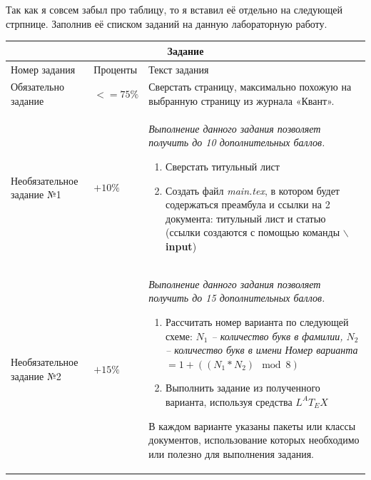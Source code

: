 \newpage
Так как я совсем забыл про таблицу, то я вставил её отдельно на следующей стрпнице. 
Заполнив её списком заданий на данную лабораторную работу.
\begin{center}
	\begin{tabular}{|p{4cm}|p{2cm}|p{10cm}|}
		\hline
		\multicolumn{3}{|c|}{Задание} \\
		\hline
		Номер задания & Проценты & Текст задания \\
		\hline
		Обязательно задание & $<= 75\%$ & Сверстать страницу, максимально
		похожую на выбранную страницу из журнала «Квант». \\
		\hline
		Необязательное задание №1 & $+10\%$ & 
		\textit{Выполнение данного задания позволяет получить до 10
		дополнительных баллов.}
		\begin{enumerate}
			\item Сверстать титульный лист
			\item Создать файл \textit{main.tex}, в котором будет
			содержаться преамбула и ссылки на 2 документа: титульный 
			лист и статью (ссылки создаются с помощью команды 
			\textbf{$\backslash$input})
		\end{enumerate}\\
		\hline
		Необязательное задание №2 & $+15\%$ & 
		\textit{Выполнение данного задания позволяет получить до 15 
		дополнительных баллов.}
		\begin{enumerate}
			\item Рассчитать номер варианта по следующей схеме: \newline
			\textit{$N_1$ – количество букв в фамилии, $N_2$ – 
			количество букв в имени}
			\newline \textit{Номер варианта }$= 1 + \left(
			\left(N_1*N_2\right)\mod 8 \right)$
			\item Выполнить задание из полученного варианта, используя
			средства $L^AT_EX$
		\end{enumerate}
		В каждом варианте указаны пакеты или классы документов,
		использование которых необходимо или полезно для выполнения
		задания.\\
		\hline
	\end{tabular}
\end{center}